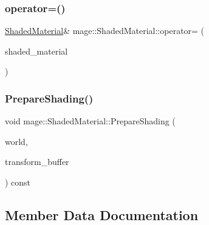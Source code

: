 \hypertarget{structmage_1_1_shaded_material_a29fb482ab140fcb47709ffda03a67714}{}\label{structmage_1_1_shaded_material_a29fb482ab140fcb47709ffda03a67714} 
\subsubsection{\texorpdfstring{operator=()}{operator=()}\hspace{0.1cm}{\footnotesize\ttfamily [2/2]}}
{\footnotesize\ttfamily \hyperlink{structmage_1_1_shaded_material}{Shaded\+Material}\& mage\+::\+Shaded\+Material\+::operator= (\begin{DoxyParamCaption}\item[{\hyperlink{structmage_1_1_shaded_material}{Shaded\+Material} \&\&}]{shaded\+\_\+material }\end{DoxyParamCaption})\hspace{0.3cm}{\ttfamily [default]}}

\hypertarget{structmage_1_1_shaded_material_afa872233ffdf89f7d60c1ac53d574e3e}{}\label{structmage_1_1_shaded_material_afa872233ffdf89f7d60c1ac53d574e3e} 
\subsubsection{\texorpdfstring{Prepare\+Shading()}{PrepareShading()}}
{\footnotesize\ttfamily void mage\+::\+Shaded\+Material\+::\+Prepare\+Shading (\begin{DoxyParamCaption}\item[{const \hyperlink{classmage_1_1_world}{World} \&}]{world,  }\item[{const Transform\+Buffer \&}]{transform\+\_\+buffer }\end{DoxyParamCaption}) const}



\subsection{Member Data Documentation}
\hypertarget{structmage_1_1_shaded_material_a319e1ca2103c50f84ce0605b08bd34b4}{}\label{structmage_1_1_shaded_material_a319e1ca2103c50f84ce0605b08bd34b4} 
